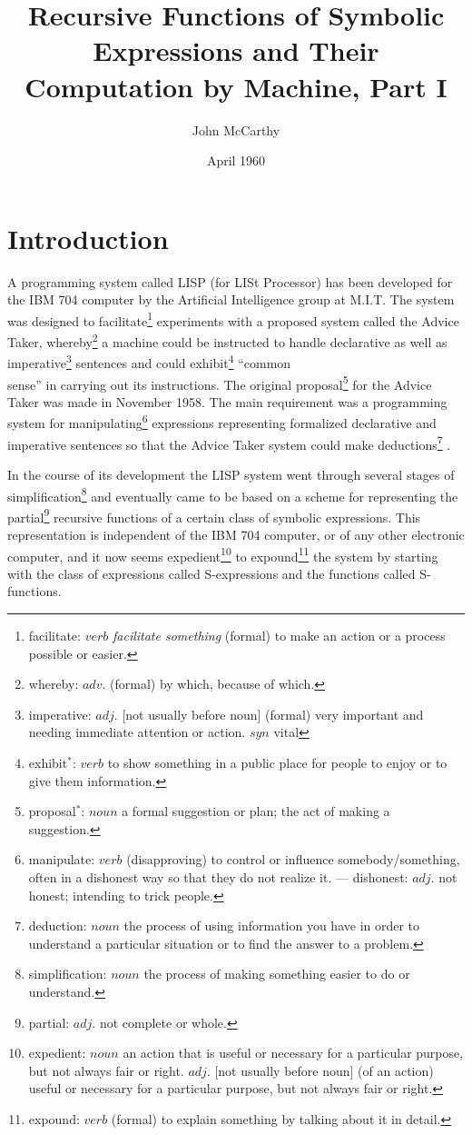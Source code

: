 \documentclass[11pt, a4paper]{article}
\title{Recursive Functions of Symbolic Expressions and Their Computation by
  Machine, Part I}
\author{John McCarthy}
\date{April 1960}
\begin{document}
\maketitle
\thispagestyle{empty}
\pagebreak

\tableofcontents
\pagebreak
{}

\section{Introduction}

A programming system called LISP (for LISt Processor) has been developed for the
IBM 704 computer by the Artificial Intelligence group at M.I.T. The system was
designed to
facilitate\footnote{facilitate: $verb$ \textit{facilitate something} (formal) to
  make an action or a process possible or easier.}
experiments with a proposed system called the Advice
Taker,
whereby\footnote{whereby: $adv.$ (formal) by which, because of which.}
a machine could be instructed to handle declarative as well as
imperative\footnote{imperative: $adj.$ [not usually before noun] (formal) very
  important and needing immediate attention or action. $syn$ vital}
sentences and could
exhibit\footnote{exhibit$^*$: $verb$ to show something in a public place for
  people to enjoy or to give them information.}
``common\\sense'' in carrying out its
instructions. The original
proposal\footnote{proposal$^*$: $noun$ a formal suggestion or plan; the act of
  making a suggestion.}
for the Advice Taker was made in November
1958. The main requirement was a programming system for
manipulating\footnote{manipulate: $verb$ (disapproving) to control or influence
  somebody/something, often in a dishonest way so that they do not realize
  it. --- dishonest: $adj.$ not honest; intending to trick people.}
expressions
representing formalized declarative and imperative sentences so that the Advice
Taker system could make
deductions\footnote{deduction: $noun$ the process of using information you have
  in order to understand a particular situation or to find the answer to a
  problem.}
.

In the course of its development the LISP system went through several stages of
simplification\footnote{simplification: $noun$ the process of making something
  easier to do or understand.}
and eventually came to be based on a scheme for representing the
partial\footnote{partial: $adj.$ not complete or whole.}
recursive functions of a certain class of symbolic expressions. This
representation is independent of the IBM 704 computer, or of any other
electronic computer, and it now seems
expedient\footnote{expedient: $noun$ an action that is useful or necessary for a
  particular purpose, but not always fair or right. $adj.$ [not usually before
    noun] (of an action) useful or necessary for a particular purpose, but not
  always fair or right.}
to
expound\footnote{expound: $verb$ (formal) to explain something by talking about
  it in detail.}
the system by
starting with the class of expressions called S-expressions and the functions
called S-functions.
\end{document}
